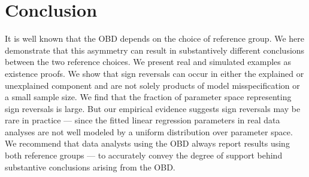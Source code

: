 \section{Conclusion}
\label{sec:conclusion}

It is well known that the OBD depends on the choice of reference group. We here demonstrate that this asymmetry can result in substantively different conclusions between the two reference choices.
We present real and simulated examples as existence proofs. We show that sign reversals can occur in either the explained or unexplained component and are not solely products of model misspecification or a small sample size. We find that the fraction of parameter space representing sign reversals is large. But our empirical evidence suggests sign reversals may be rare in practice --- since the fitted linear regression parameters  in real data analyses are not well modeled by a uniform distribution over parameter space. We recommend that data analysts using the OBD always report results using both reference groups --- to accurately convey the degree of support behind substantive conclusions arising from the OBD.


